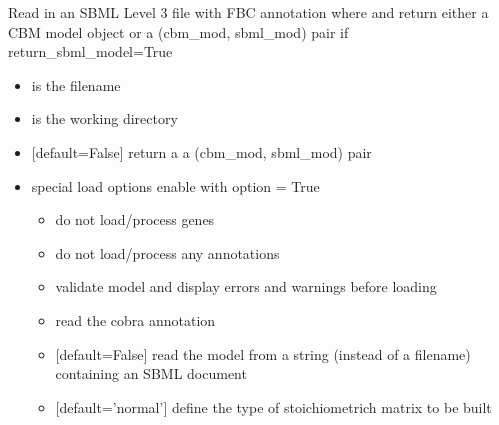 \documentclass[letterpaper,10pt,english]{sphinxmanual}
\begin{document}
\begin{fulllineitems}
\label{\detokenize{modules_doc:cbmpy.CBXML.sbml_readSBML3FBC}}
\pysigstartsignatures
{}
\pysigstopsignatures
\sphinxAtStartPar
Read in an SBML Level 3 file with FBC annotation where and return either a CBM model object
or a (cbm\_mod, sbml\_mod) pair if return\_sbml\_model=True
\begin{itemize}
\item {} 
\sphinxAtStartPar
{} is the filename

\item {} 
\sphinxAtStartPar
{} is the working directory

\item {} 
\sphinxAtStartPar
{} {[}default=False{]} return a a (cbm\_mod, sbml\_mod) pair

\item {} 
\sphinxAtStartPar
{} special load options enable with option = True
\begin{itemize}
\item {} 
\sphinxAtStartPar
{} do not load/process genes

\item {} 
\sphinxAtStartPar
{} do not load/process any annotations

\item {} 
\sphinxAtStartPar
{} validate model and display errors and warnings before loading

\item {} 
\sphinxAtStartPar
{} read the cobra annotation

\item {} 
\sphinxAtStartPar
{} {[}default=False{]} read the model from a string (instead of a filename) containing an SBML document

\item {} 
\sphinxAtStartPar
{} {[}default=’normal’{]} define the type of stoichiometrich matrix to be built


\end{itemize}
\end{itemize}
\end{fulllineitems}
\end{document}
